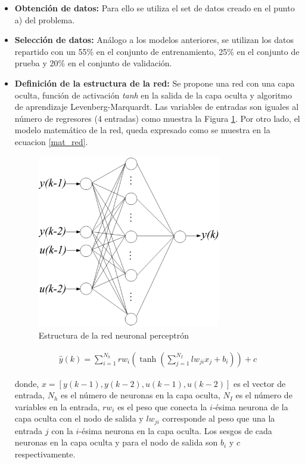 \documentclass[12pt]{article}
\begin{document}
\begin{itemize}
	\item \textbf{Obtención de datos:} Para ello se utiliza el set de datos creado en el punto a) del problema.
	\item \textbf{Selección de datos:} Análogo a los modelos anteriores, se utilizan los datos repartido con un 55\% en el conjunto de entrenamiento, 25\% en el conjunto de prueba y 20\% en el conjunto de validación.
	\item \textbf{Definición de la estructura de la red:} Se propone una red con una capa oculta, función de activación \textit{tanh} en la salida de la capa oculta y algoritmo de aprendizaje Levenberg-Marquardt. Las variables de entradas son iguales al número de regresores (4 entradas) como muestra la Figura \ref{estred}. Por otro lado, el modelo matemático de la red, queda expresado como se muestra en la ecuacion \ref{mat_red}.
	\begin{figure}[h!]
		\centering
		 \includegraphics[width=8cm]{imag/redes/estructura.eps}
		\caption{Estructura de la red neuronal perceptrón}
		\label{estred}
	\end{figure}
	\begin{align}
	\hat{y}(k) = \sum_{i=1}^{N_h} rw_i \left( \tanh\left(\sum_{j=1}^{N_I} lw_{ji} x_j + b_i\right)\right) + c
	\label{mat_red}
	\end{align}
	
	donde, $x = [y(k-1), y(k-2), u(k-1), u(k-2)]$ es el vector de entrada, $N_h$ es el número de neuronas en la capa oculta, $N_I$ es el número de variables en la entrada, $rw_i$ es el peso que conecta la $i$-ésima neurona de la capa oculta con el nodo de salida y $lw_{ji}$ corresponde al peso que una la entrada $j$ con la $i$-ésima neurona en la capa oculta. Los sesgos de cada neuronas en la capa oculta y para el nodo de salida son $b_i$ y $c$ respectivamente.
	

\end{itemize}
\end{document}
